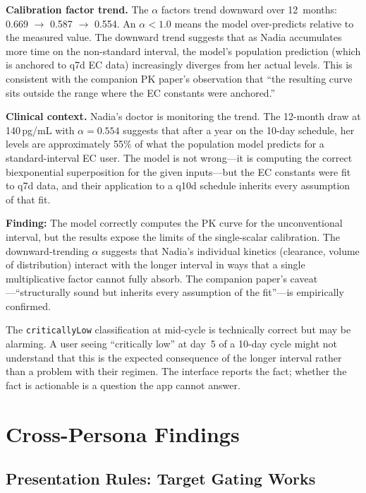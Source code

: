 \documentclass[11pt,a4paper]{article}
\newcommand{\code}[1]{\texttt{\small #1}}
\begin{document}
\textbf{Calibration factor trend.} The $\alpha$ factors trend downward over
12~months: 0.669 $\rightarrow$ 0.587 $\rightarrow$ 0.554. An $\alpha < 1.0$
means the model over-predicts relative to the measured value. The downward
trend suggests that as Nadia accumulates more time on the non-standard
interval, the model's population prediction (which is anchored to q7d EC
data) increasingly diverges from her actual levels. This is consistent with
the companion PK paper's observation that ``the resulting curve sits outside
the range where the EC constants were anchored.''

\textbf{Clinical context.} Nadia's doctor is monitoring the trend. The
12-month draw at 140\,pg/mL with $\alpha = 0.554$ suggests that after a year
on the 10-day schedule, her levels are approximately 55\% of what the
population model predicts for a standard-interval EC user. The model is not
wrong---it is computing the correct biexponential superposition for the
given inputs---but the EC constants were fit to q7d data, and their
application to a q10d schedule inherits every assumption of that fit.

\textbf{Finding:} The model correctly computes the PK curve for the
unconventional interval, but the results expose the limits of the
single-scalar calibration. The downward-trending $\alpha$ suggests that
Nadia's individual kinetics (clearance, volume of distribution) interact
with the longer interval in ways that a single multiplicative factor cannot
fully absorb. The companion paper's caveat---``structurally sound but
inherits every assumption of the fit''---is empirically confirmed.

The \code{criticallyLow} classification at mid-cycle is technically correct
but may be alarming. A user seeing ``critically low'' at day~5 of a 10-day
cycle might not understand that this is the expected consequence of the
longer interval rather than a problem with their regimen. The interface
reports the fact; whether the fact is actionable is a question the app
cannot answer.

\section{Cross-Persona Findings}
\label{sec:cross}

\subsection{Presentation Rules: Target Gating Works}
\end{document}
